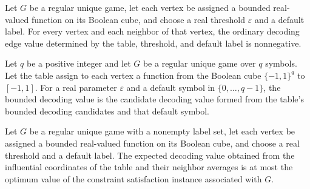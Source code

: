 \begin{theorem}
\label{FABL.RegularUniqueGame.boundedDecodingEdgeValue_nonneg}
\leanok
{}
Let $G$ be a regular unique game, let each vertex be assigned a bounded real-valued
function on its Boolean cube, and choose a real threshold $\varepsilon$ and a default
label. For every vertex and each neighbor of that vertex, the ordinary decoding edge
value determined by the table, threshold, and default label is nonnegative.
\end{theorem}

\begin{definition}
\label{FABL.RegularUniqueGame.boundedDecodingValue}
\leanok
{}
Let $q$ be a positive integer and let $G$ be a regular unique game over $q$ symbols. Let
the table assign to each vertex a function from the Boolean cube $\{−1,1\}^{q}$ to
$[-1,1]$. For a real parameter $\varepsilon$ and a default symbol in
$\{0,\ldots,q-1\}$, the bounded decoding value is the candidate decoding value formed
from the table’s bounded decoding candidates and that default symbol.
\end{definition}

\begin{theorem}
\label{FABL.RegularUniqueGame.boundedDecodingValue_le_optimum}
\leanok
{}
Let $G$ be a regular unique game with a nonempty label set, let each vertex be assigned
a bounded real-valued function on its Boolean cube, and choose a real threshold and a
default label. The expected decoding value obtained from the influential coordinates of
the table and their neighbor averages is at most the optimum value of the constraint
satisfaction instance associated with $G$.
\end{theorem}

